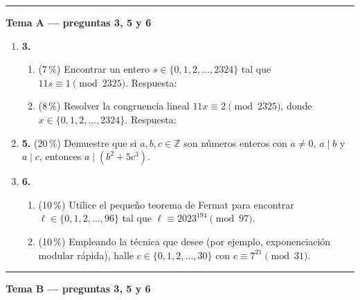 \documentclass[11pt]{article}
\newcommand{\resp}{\underline{\hspace{3cm}}}
\begin{document}
\bigskip\hrule\medskip
\begin{center}\bfseries Tema A --- preguntas 3, 5 y 6\end{center}

\begin{enumerate}
\item[]\textbf{3.}
\begin{enumerate}[label=(\alph*)]
\item (7\,\%) Encontrar un entero $s \in \{0, 1, 2, \dots, 2324\}$ tal que $11s \equiv 1 \pmod{2325}$. \hfill Respuesta: \resp
\item (8\,\%) Resolver la congruencia lineal $11x \equiv 2 \pmod{2325}$, donde $x \in \{0, 1, 2, \dots, 2324\}$. \hfill Respuesta: \resp
\end{enumerate}

\item[]\textbf{5.} (20\,\%) Demuestre que si $a, b, c \in \mathbb{Z}$ son números enteros con $a \neq 0$, $a \mid b$ y $a \mid c$, entonces $a \mid (b^2 + 5c^3)$.

\item[]\textbf{6.}
\begin{enumerate}[label=(\alph*)]
\item (10\,\%) Utilice el pequeño teorema de Fermat para encontrar $\ell \in \{0, 1, 2, \dots, 96\}$ tal que $\ell \equiv 2023^{194} \pmod{97}$.
\item (10\,\%) Empleando la técnica que desee (por ejemplo, exponenciación modular rápida), halle $c \in \{0, 1, 2, \dots, 30\}$ con $c \equiv 7^{21} \pmod{31}$.
\end{enumerate}
\end{enumerate}

\bigskip\hrule\medskip
\begin{center}\bfseries Tema B --- preguntas 3, 5 y 6\end{center}
\end{document}

